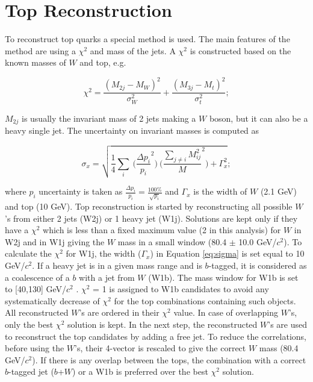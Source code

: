 \section{Top Reconstruction}
\label{sect:top}
To reconstruct top quarks a special method is used.  
The main features 
of the method are using a $\chi^2$ and mass of the jets. A $\chi^2$ is
constructed based on the known masses of $W$ and top, e.g.
\begin{linenomath}
\begin{equation}
\label{eq:chi2}
\chi^2 = \frac{(M_{2j} - M_W)^2}{\sigma^2_W} + \frac{(M_{3j} - M_t)^2}{\sigma^2_t}; 
\end{equation}
\end{linenomath}
$M_{2j}$ is usually the invariant mass of 2 jets making a $W$ boson, 
but it can also be a heavy single jet. The uncertainty on invariant masses is computed as
\begin{linenomath}
\begin{equation}
\label{eq:sigma}
\sigma_x = \sqrt{\frac{1}{4}\sum_{i} \pod{\frac{\Delta p_i}{p_i}}^2\pod{\frac{\sum_{j \neq i} M_{ij}^2}{M}}^2 + \Gamma_x^2}; 
\end{equation}
\end{linenomath}
where $p_i$ uncertainty is taken as $\frac{\Delta p_i}{p_i} = \frac{100\%}{\sqrt{p_i}}$ and $\Gamma_x$ is the width of $W$ (2.1 GeV) 
and top (10 GeV). Top reconstruction is started by reconstructing all possible $W$'s from either 2 jets (W2j) or 1 heavy jet (W1j).
Solutions are kept only if they have a $\chi^2$ which is less than a fixed maximum value (2 in this analysis) for $W$ in W2j
and in W1j giving the $W$ mass in a small window (80.4 $\pm$ 10.0 GeV/$c^2$). To calculate the $\chi^2$ for W1j, the width ($\Gamma_x$) in 
Equation \ref{eq:sigma} is set equal to 10 GeV/$c^2$. If a heavy jet is in a given mass range and is $b$-tagged, 
it is considered as a coalescence of a $b$ with a jet from $W$ (W1b). The mass window for W1b is set to [40,130] GeV/$c^2$ . 
$\chi^2$ = 1 is assigned to W1b candidates to avoid any systematically decrease of $\chi^2$ for the top combinations containing such objects.
All reconstructed $W$'s are ordered in their $\chi^2$ value. In case of overlapping $W$'s, only the best $\chi^2$ solution is kept. 
In the next step, the reconstructed $W$'s are used to reconstruct the top candidates by adding a free jet. To reduce the correlations,
before using the $W$'s, their 4-vector is rescaled to give the correct $W$ mass (80.4 GeV/$c^2$). If there is any overlap between the tops, 
the combination with a correct $b$-tagged jet ($b$+$W$) or a W1b is preferred over the best $\chi^2$ solution. 


